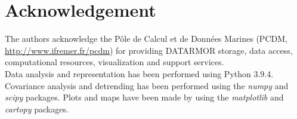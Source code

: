 \documentclass[review, 12pt]{elsarticle}
\begin{document}






\section*{Acknowledgement}

The authors acknowledge the Pôle de Calcul et de Données Marines (PCDM, \url{http://www.ifremer.fr/pcdm}) for providing DATARMOR storage, data access, computational resources, visualization and support services.\\
Data analysis and representation has been performed using Python 3.9.4. 
Covariance analysis and detrending has been performed using the \emph{numpy} and \emph{scipy} packages. Plots and maps have been made by using the \emph{matplotlib} and \emph{cartopy} packages.
\listoffigures
\listoftables

\clearpage


\end{document}
